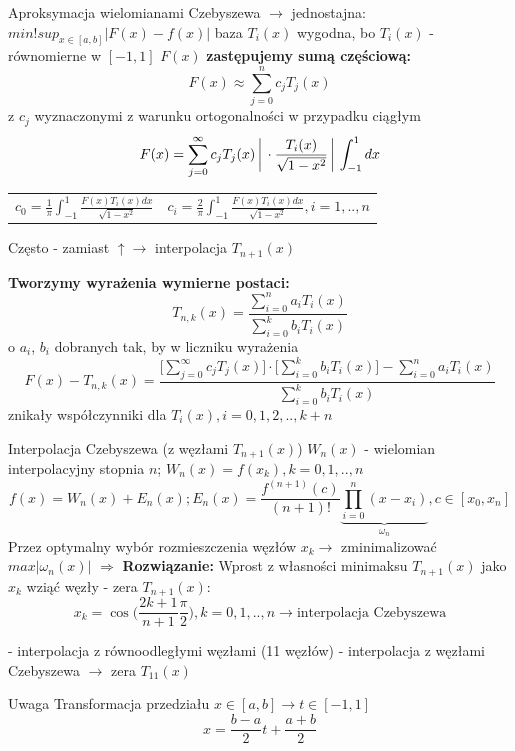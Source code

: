 \begin{frame}{Aproksymacja wielomianami Czebyszewa}
	$\rightarrow$ jednostajna: $min!sup_{x \in [a,b]}|F(x)-f(x)|$ \newline
    baza $T_i(x)$ wygodna, bo $T_i(x)$ - równomierne w $[-1,1]$ \newline
    $F(x)$ \textbf{zastępujemy sumą częściową:}
    $$F(x) \approx \sum_{j=0}^{n}c_jT_j(x)$$
    z $c_j$ wyznaczonymi z warunku ortogonalności w przypadku ciągłym
    $$F(x) = \sum_{j=0}^{\infty}c_jT_j(x)    \bigg\arrowvert \cdot\frac{T_i(x)}{\sqrt{1-x^2}}  \bigg\arrowvert \int_{-1}^{1}dx$$
    \begin{tabular}{ll}
    $c_0 = \frac{1}{\pi}\int_{-1}^{1}\frac{F(x)T_i(x)dx}{\sqrt{1-x^2}}$ &
    $c_i = \frac{2}{\pi}\int_{-1}^{1}\frac{F(x)T_i(x)dx}{\sqrt{1-x^2}}, i=1,..,n$
    \end{tabular}
    
    Często - zamiast $\uparrow \rightarrow$ interpolacja $T_{n+1}(x)$
\end{frame}
\begin{frame}
	\textbf{Tworzymy wyrażenia wymierne postaci:}
    $$T_{n,k}(x) = \frac{\sum_{i=0}^{n}a_iT_i(x)}{\sum_{i=0}^{k}b_iT_i(x)}$$
    o $a_i$, $b_i$ dobranych tak, by w liczniku wyrażenia 
    $$F(x)-T_{n,k}(x) = \frac{\big[\sum_{j=0}^{\infty}c_jT_j(x)\big] \cdot \big[\sum_{i=0}^{k}b_iT_i(x)\big] - \sum_{i=0}^{n}a_iT_i(x)}{\sum_{i=0}^{k}b_iT_i(x)}$$
    znikały współczynniki dla $T_i(x),i=0,1,2,..,k+n$
\end{frame}
\begin{frame}{Interpolacja Czebyszewa (z węzłami $T_{n+1}(x)$)}
	$W_n(x)$ - wielomian interpolacyjny stopnia $n$; $W_n(x) = f(x_k),k=0,1,..,n$
    $$f(x) = W_n(x)+E_n(x); E_n(x) = \frac{f^{(n+1)}(c)}{(n+1)!}\underbrace{\prod_{i=0}^{n}(x-x_i)}_{\omega_n}
	, c \in [x_0,x_n]$$
    Przez optymalny wybór rozmieszczenia węzłów $x_k \rightarrow$ zminimalizować $max|\omega_n(x)|$\newline
    $\Rightarrow$ \textbf{Rozwiązanie:} Wprost z własności minimaksu $T_{n+1}(x)$ jako $x_k$ wziąć węzły - zera $T_{n+1}(x)$:
    $$x_k = \cos \Big(\frac{2k+1}{n+1}\frac{\pi}{2}\Big), k=0,1,..,n \rightarrow \text{interpolacja Czebyszewa}$$
    
\end{frame}
\begin{frame}
	- interpolacja z równoodległymi węzłami (11 węzłów)\newline
    - interpolacja z węzłami Czebyszewa $\rightarrow$ zera $T_{11}(x)$
    \begin{block}{Uwaga}
    Transformacja przedziału $x \in [a,b] \rightarrow t \in [-1,1]$
    $$x=\frac{b-a}{2}t+\frac{a+b}{2}$$
    \end{block}
\end{frame}
